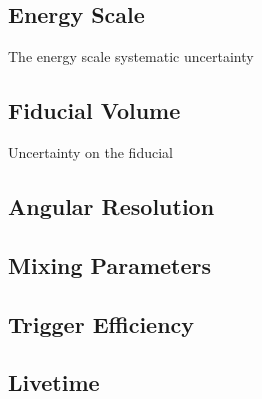 \subsection{Energy Scale}
The energy scale systematic uncertainty
\subsection{Fiducial Volume}
Uncertainty on the fiducial
\subsection{Angular Resolution}
\subsection{Mixing Parameters}
\subsection{Trigger Efficiency}
\subsection{Livetime}
